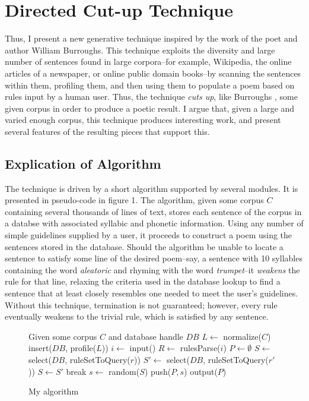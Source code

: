 \documentclass[10pt]{article}
\begin{document}
\section{Directed Cut-up Technique}
Thus, I present a new generative technique inspired by the work of the poet and
author William Burroughs. This technique exploits the diversity and large
number of sentences found in large corpora--for example, Wikipedia, the online
articles of a newspaper, or online public domain books--by scanning the
sentences within them, profiling them, and then using them to populate a poem
based on rules input by a human user. Thus, the technique \emph{cuts up}, like
Burroughs \cite{wikiCutup}, some given corpus in order to produce a poetic
result. I argue that, given a large and varied enough corpus, this technique
produces interesting work, and present several features of the resulting pieces
that support this.

\subsection{Explication of Algorithm}
The technique is driven by a short algorithm  supported by several modules. It
is presented in pseudo-code in figure 1. The algorithm, given some corpus $C$
containing several thousands of lines of text, stores each sentence of the
corpus in a databse with associated syllabic and phonetic information. Using
any number of simple guidelines supplied by a user, it proceeds to construct a
poem using the sentences stored in the database. Should the algorithm be unable
to locate a sentence to satisfy some line of the desired poem--say, a sentence with
10 syllables containing the word \emph{aleatoric} and rhyming with the word
\emph{trumpet}--it \emph{weakens} the rule for that line, relaxing the criteria
used in the database lookup to find a sentence that at least closely resembles
one needed to meet the user's guidelines. Without this technique, termination
is not guaranteed; however, every rule eventually weakens to the trivial rule,
which is satisfied by any sentence.

\pagebreak
\onehalfspacing
\begin{figure}[here]
\begin{algorithmic}
\STATE Given some corpus $C$ and database handle $DB$
\STATE $L\gets$ normalize($C$)
\STATE insert($DB$, profile($L$))
\STATE $i \gets$ input()
\STATE $R \gets$ rulesParse($i$) 
\STATE $P \gets \emptyset$ 
    \STATE $S \gets$ select($DB$, ruleSetToQuery($r$))
            \STATE $S\prime \gets$ select($DB$, ruleSetToQuery($r\prime$))
                \STATE $S \gets S\prime$
                \STATE break
            \ENDIF
        \ENDWHILE
    \ENDIF
    \STATE $s \gets$ random($S$)
    \STATE push($P, s$)
\ENDFOR
\STATE output($P$)
\end{algorithmic}
\caption{My algorithm}
\label{fig:algorithm}
\end{figure}
\doublespacing
\end{document}
